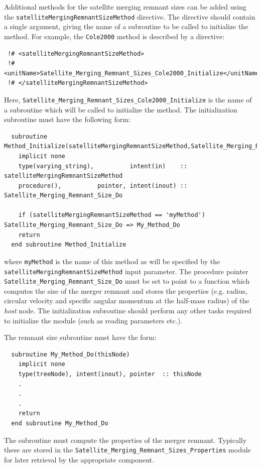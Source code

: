 Additional methods for the satellite merging remnant sizes can be added using the {\tt satelliteMergingRemnantSizeMethod} directive. The directive should contain a single argument, giving the name of a subroutine to be called to initialize the method. For example, the {\tt Cole2000} method is described by a directive:
\begin{verbatim}
 !# <satelliteMergingRemnantSizeMethod>
 !#  <unitName>Satellite_Merging_Remnant_Sizes_Cole2000_Initialize</unitName>
 !# </satelliteMergingRemnantSizeMethod>
\end{verbatim}
Here, {\tt Satellite\_Merging\_Remnant\_Sizes\_Cole2000\_Initialize} is the name of a subroutine which will be called to initialize the method. The initialization subroutine must have the following form:
\begin{verbatim}
  subroutine Method_Initialize(satelliteMergingRemnantSizeMethod,Satellite_Merging_Remnant_Size_Do)
    implicit none
    type(varying_string),          intent(in)    :: satelliteMergingRemnantSizeMethod
    procedure(),          pointer, intent(inout) :: Satellite_Merging_Remnant_Size_Do
    
    if (satelliteMergingRemnantSizeMethod == 'myMethod') Satellite_Merging_Remnant_Size_Do => My_Method_Do
    return
  end subroutine Method_Initialize
\end{verbatim}
where {\tt myMethod} is the name of this method as will be specified by the {\tt satelliteMergingRemnantSizeMethod} input parameter. The procedure pointer {\tt Satellite\_Merging\_Remnant\_Size\_Do} must be set to point to a function which computes the size of the merger remnant and stores the properties (e.g. radius, circular velocity and specific angular momentum at the half-mass radius) of the \emph{host} node. The initialization subroutine should perform any other tasks required to initialize the module (such as reading parameters etc.).

The remnant size subroutine must have the form:
\begin{verbatim}
  subroutine My_Method_Do(thisNode)
    implicit none
    type(treeNode), intent(inout), pointer  :: thisNode
    .
    .
    .
    return
  end subroutine My_Method_Do
\end{verbatim}
The subroutine must compute the properties of the merger remnant. Typically these are stored in the {\tt Satellite\_Merging\_Remnant\_Sizes\_Properties} module for later retrieval by the appropriate component.

